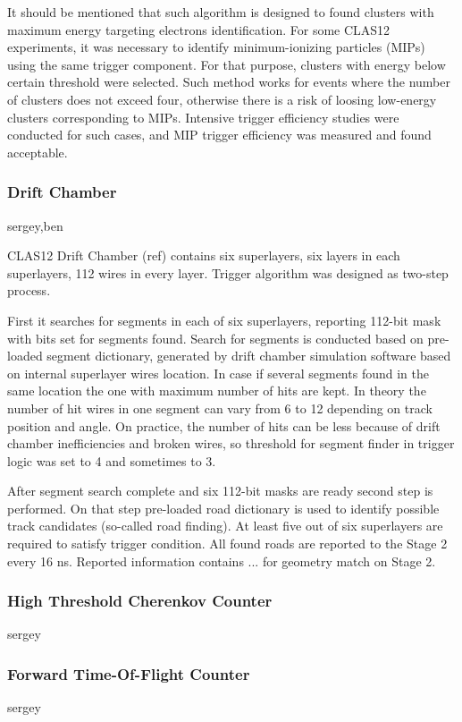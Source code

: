 It should be mentioned that such algorithm is designed to found clusters with maximum energy targeting electrons identification. For some CLAS12 experiments, it was necessary to identify minimum-ionizing particles (MIPs) using the same trigger component. For that purpose, clusters with energy below certain threshold were selected. Such method works for events where the number of clusters does not exceed four, otherwise there is a risk of loosing low-energy clusters corresponding to MIPs. Intensive trigger efficiency studies were conducted for such cases, and MIP trigger efficiency was measured and found acceptable.


\subsubsection{Drift Chamber} sergey,ben

CLAS12 Drift Chamber (ref) contains six superlayers, six layers in each superlayers, 112 wires in every layer. Trigger algorithm was designed as two-step process.

First it searches for segments in each of six superlayers, reporting 112-bit mask with bits set for segments found. Search for segments is conducted based on pre-loaded segment dictionary, generated by drift chamber simulation software based on internal superlayer wires location. In case if several segments found in the same location the one with maximum number of hits are kept. In theory the number of hit wires in one segment can vary from 6 to 12 depending on track position and angle. On practice, the number of hits can be less because of drift chamber inefficiencies and broken wires, so threshold for segment finder in trigger logic was set to 4 and sometimes to 3.

After segment search complete and six 112-bit masks are ready second step is performed. On that step pre-loaded road dictionary is used to identify possible track candidates (so-called road finding). At least five out of six superlayers are required to satisfy trigger condition. All found roads are reported to the Stage 2 every 16 ns. Reported information contains ... for geometry match on Stage 2.



\subsubsection{High Threshold Cherenkov Counter} sergey

\subsubsection{Forward Time-Of-Flight Counter} sergey

